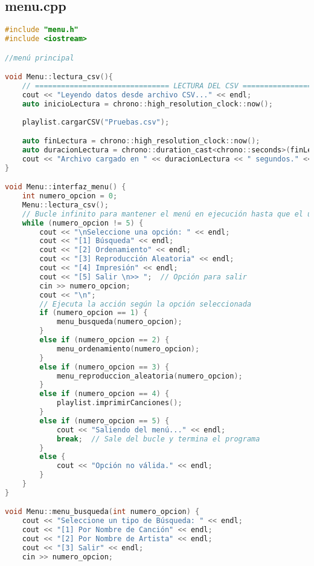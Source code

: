 \documentclass[corference]{IEEEtran}
\begin{document}
\begin{flushleft}
            \subsection{menu.cpp}
            
            \begin{sloppypar}
            \begin{lstlisting}[language=C++, style=mystyle, caption={Cabecera de la Clase Menú}]
#include "menu.h"
#include <iostream>

//menú principal

void Menu::lectura_csv(){
    // =============================== LECTURA DEL CSV ===============================
    cout << "Leyendo datos desde archivo CSV..." << endl;
    auto inicioLectura = chrono::high_resolution_clock::now();
    
    playlist.cargarCSV("Pruebas.csv");

    auto finLectura = chrono::high_resolution_clock::now();
    auto duracionLectura = chrono::duration_cast<chrono::seconds>(finLectura - inicioLectura).count();
    cout << "Archivo cargado en " << duracionLectura << " segundos." << endl; 
}

void Menu::interfaz_menu() {
    int numero_opcion = 0;
    Menu::lectura_csv();
    // Bucle infinito para mantener el menú en ejecución hasta que el usuario elija salir
    while (numero_opcion != 5) {
        cout << "\nSeleccione una opción: " << endl;
        cout << "[1] Búsqueda" << endl;
        cout << "[2] Ordenamiento" << endl;
        cout << "[3] Reproducción Aleatoria" << endl;
        cout << "[4] Impresión" << endl;
        cout << "[5] Salir \n>> ";  // Opción para salir
        cin >> numero_opcion;
        cout << "\n";
        // Ejecuta la acción según la opción seleccionada
        if (numero_opcion == 1) {
            menu_busqueda(numero_opcion);
        }
        else if (numero_opcion == 2) {
            menu_ordenamiento(numero_opcion);
        }
        else if (numero_opcion == 3) {
            menu_reproduccion_aleatoria(numero_opcion);
        }
        else if (numero_opcion == 4) {
            playlist.imprimirCanciones();
        }
        else if (numero_opcion == 5) {
            cout << "Saliendo del menú..." << endl;
            break;  // Sale del bucle y termina el programa
        }
        else {
            cout << "Opción no válida." << endl;
        }
    }
}

void Menu::menu_busqueda(int numero_opcion) {
    cout << "Seleccione un tipo de Búsqueda: " << endl;
    cout << "[1] Por Nombre de Canción" << endl;
    cout << "[2] Por Nombre de Artista" << endl;
    cout << "[3] Salir" << endl;
    cin >> numero_opcion;


\end{lstlisting}
\end{sloppypar}
\end{flushleft}
\end{document}
